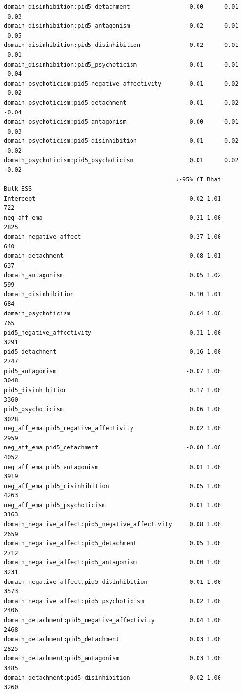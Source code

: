 \documentclass[
  11pt,
  a4paper,
  onecolumn]{article}
\begin{document}
\begin{verbatim}
domain_disinhibition:pid5_detachment                 0.00      0.01    -0.03
domain_disinhibition:pid5_antagonism                -0.02      0.01    -0.05
domain_disinhibition:pid5_disinhibition              0.02      0.01    -0.01
domain_disinhibition:pid5_psychoticism              -0.01      0.01    -0.04
domain_psychoticism:pid5_negative_affectivity        0.01      0.02    -0.02
domain_psychoticism:pid5_detachment                 -0.01      0.02    -0.04
domain_psychoticism:pid5_antagonism                 -0.00      0.01    -0.03
domain_psychoticism:pid5_disinhibition               0.01      0.02    -0.02
domain_psychoticism:pid5_psychoticism                0.01      0.02    -0.02
                                                 u-95% CI Rhat Bulk_ESS
Intercept                                            0.02 1.01      722
neg_aff_ema                                          0.21 1.00     2825
domain_negative_affect                               0.27 1.00      640
domain_detachment                                    0.08 1.01      637
domain_antagonism                                    0.05 1.02      599
domain_disinhibition                                 0.10 1.01      684
domain_psychoticism                                  0.04 1.00      765
pid5_negative_affectivity                            0.31 1.00     3291
pid5_detachment                                      0.16 1.00     2747
pid5_antagonism                                     -0.07 1.00     3048
pid5_disinhibition                                   0.17 1.00     3360
pid5_psychoticism                                    0.06 1.00     3028
neg_aff_ema:pid5_negative_affectivity                0.02 1.00     2959
neg_aff_ema:pid5_detachment                         -0.00 1.00     4052
neg_aff_ema:pid5_antagonism                          0.01 1.00     3919
neg_aff_ema:pid5_disinhibition                       0.05 1.00     4263
neg_aff_ema:pid5_psychoticism                        0.01 1.00     3163
domain_negative_affect:pid5_negative_affectivity     0.08 1.00     2659
domain_negative_affect:pid5_detachment               0.05 1.00     2712
domain_negative_affect:pid5_antagonism               0.00 1.00     3231
domain_negative_affect:pid5_disinhibition           -0.01 1.00     3573
domain_negative_affect:pid5_psychoticism             0.02 1.00     2406
domain_detachment:pid5_negative_affectivity          0.04 1.00     2468
domain_detachment:pid5_detachment                    0.03 1.00     2825
domain_detachment:pid5_antagonism                    0.03 1.00     3485
domain_detachment:pid5_disinhibition                 0.02 1.00     3260

\end{verbatim}
\end{document}
